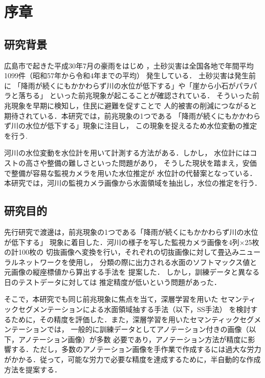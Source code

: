 \section{序章}
\subsection{研究背景}
\label{1.1}
広島市で起きた平成30年7月の豪雨をはじめ
，土砂災害は全国各地で年間平均1099件（昭和57年から令和4年までの平均）
発生している\cite{mlit}．
土砂災害は発生前に
「降雨が続くにもかかわらず川の水位が低下する」や「崖から小石がパラパラと落ちる」
といった前兆現象が起こることが確認されている\cite{zentyou}．
そういった前兆現象を早期に検知し，住民に避難を促すことで
人的被害の削減につながると期待されている．本研究では，前兆現象の1つである
「降雨が続くにもかかわらず川の水位が低下する」現象に注目し，
この現象を捉えるため水位変動の推定を行う.

河川の水位変動を水位計を用いて計測する方法がある．しかし，
水位計にはコストの高さや整備の難しさといった問題があり，
そうした現状を踏まえ，安価で整備が容易な監視カメラを用いた水位推定が
水位計の代替案となっている\cite{seman}．
本研究では，河川の監視カメラ画像から水面領域を抽出し，水位の推定を行う．

\subsection{研究目的}
\label{1.2}
先行研究で渡邊\cite{watanabe}は，前兆現象の1つである「降雨が続くにもかかわらず川の水位が低下する」
現象に着目した．河川の様子を写した監視カメラ画像を4列×25枚の計100枚の
切抜画像へ変換を行い，それぞれの切抜画像に対して畳込みニューラルネットワークを使用し，
分類の際に出力される水面のソフトマックス値と元画像の縦座標値から算出する手法を
提案した．
しかし，訓練データと異なる日のテストデータに対しては
推定精度が低いという問題があった．

そこで，本研究でも同じ前兆現象に焦点を当て，深層学習を用いた
セマンティックセグメンテーションによる水面領域抽する手法（以下，SS手法）
を検討するために，その精度を評価した．また，深層学習を用いたセマンティックセグメンテーションでは，
一般的に訓練データとしてアノテーション付きの画像（以下，アノテーション画像）が多数
必要であり，アノテーション方法が精度に影響する．ただし，多数のアノテーション画像を手作業で作成するには過大な労力
がかかる．従って，可能な労力で必要な精度を達成するために，半自動的な作成方法を提案する．

\clearpage

